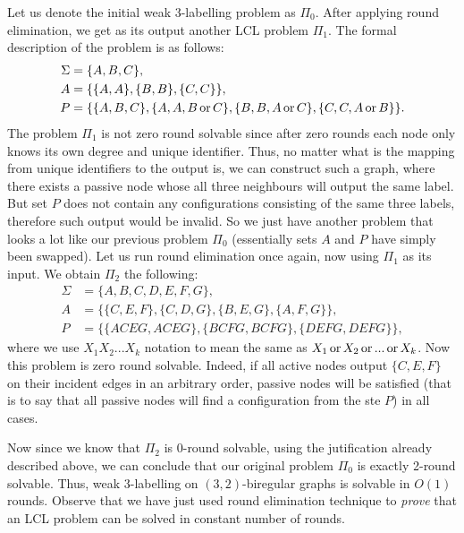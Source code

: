 Let us denote the initial weak 3-labelling problem as $\Pi_0$. After applying round elimination, we get as its
output another LCL problem $\Pi_1$. The formal description of the problem is as follows:
\begin{align*}
\Sigma &= \{A, B, C\}, \\
A &= \{ \{A, A\}, \{B, B\}, \{C, C\}\}, \\
P &= \{ \{A, B ,C\}, \{A, A, B \operatorname{or} C\}, \{B, B, A \operatorname{or} C\}, \{C, C, A \operatorname{or} B\} \}.
\end{align*}
The problem $\Pi_1$ is not zero round solvable since after zero rounds each node only
knows its own degree and unique identifier. Thus, no matter what is the mapping from
unique identifiers to the output is, we can construct such a graph, where there exists
a passive node whose all three neighbours will output the same label. But set $P$ does not
contain any configurations consisting of the same three labels, therefore such
output would be invalid. So we just have another problem that looks a lot like our
previous problem $\Pi_0$ (essentially sets $A$ and $P$ have simply been swapped).
Let us run round elimination once again, now using $\Pi_1$ as its input. We obtain
$\Pi_2$ the following:
\begin{align*}
\Sigma &= \{A, B, C, D, E, F, G\}, \\
A &= \{ \{C, E, F\}, \{C, D, G\}, \{B, E, G\}, \{A, F, G\}\}, \\
P &= \{ \{ACEG, ACEG\}, \{BCFG, BCFG\}, \{DEFG, DEFG\} \},
\end{align*}
where we use $X_1X_2...X_k$ notation to mean the same as $X_1 \operatorname{or} X_2 \operatorname{or} ... \operatorname{or} X_k$.
Now this problem is zero round solvable. Indeed, if all active nodes output $\{C, E, F\}$
on their incident edges in an arbitrary order, passive nodes will be satisfied (that is to say
that all passive nodes will find a configuration from the ste $P$) in all cases.

Now since we know that $\Pi_2$ is 0-round solvable, using the jutification already described
above, we can conclude that our original problem $\Pi_0$ is exactly 2-round solvable. Thus,
weak 3-labelling on $(3, 2)$-biregular graphs is solvable in $O(1)$ rounds. Observe that
we have just used round elimination technique to \emph{prove} that an LCL problem can be
solved in constant number of rounds.

